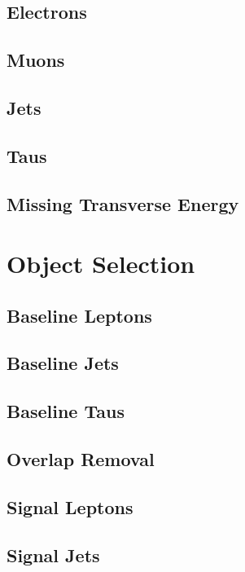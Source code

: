 		\subsection{Electrons}


		\subsection{Muons}


		\subsection{Jets}


		\subsection{Taus}


		\subsection{Missing Transverse Energy}




	\section{Object Selection}

		\subsection{Baseline Leptons}


		\subsection{Baseline Jets}


		\subsection{Baseline Taus}


		\subsection{Overlap Removal}


		\subsection{Signal Leptons}


		\subsection{Signal Jets}


